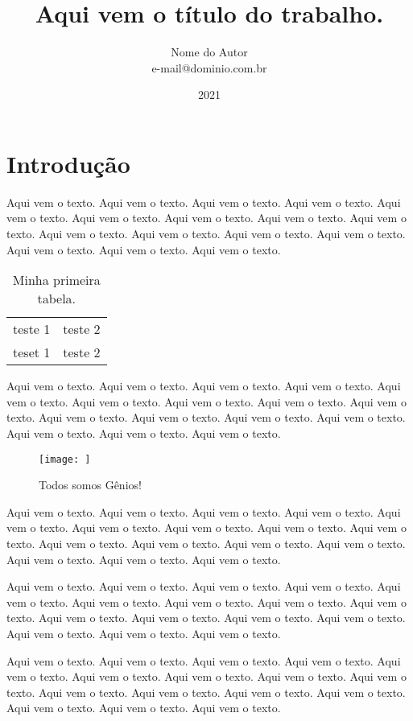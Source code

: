 \documentclass[a4paper, 12pt]{article}
\title{Aqui vem o título do trabalho.}
\author{Nome do Autor \\ e-mail@dominio.com.br}
\date{2021}
\begin{document}
\maketitle
\tableofcontents \newpage
\listoffigures \newpage
\listoftables \newpage

\section{Introdução}

Aqui vem o texto. Aqui vem o texto. Aqui vem o texto. Aqui vem o texto.
Aqui vem o texto. Aqui vem o texto. Aqui vem o texto. Aqui vem o texto.
Aqui vem o texto. Aqui vem o texto. Aqui vem o texto. Aqui vem o texto.
Aqui vem o texto. Aqui vem o texto. Aqui vem o texto. Aqui vem o texto. \cite{meuatalho}

\begin{table}[htb]
 \centering
 \begin{tabular}{|c|c|}
  teste 1 & teste 2 \\
  teset 1 & teste 2 \\ 
 \end{tabular}
 \caption{Minha primeira tabela.}
 \label{minha-tabela}
\end{table}

Aqui vem o texto. Aqui vem o texto. Aqui vem o texto. Aqui vem o texto.
Aqui vem o texto. Aqui vem o texto. Aqui vem o texto. Aqui vem o texto.
Aqui vem o texto. Aqui vem o texto. Aqui vem o texto. Aqui vem o texto.
Aqui vem o texto. Aqui vem o texto. Aqui vem o texto. Aqui vem o texto.

\begin{figure}[htb]
 \centering
 \texttt{[image: ]}
 \caption{Todos somos Gênios!}
 \label{figura-genios}
\end{figure}

Aqui vem o texto. Aqui vem o texto. Aqui vem o texto. Aqui vem o texto.
Aqui vem o texto. Aqui vem o texto. Aqui vem o texto. Aqui vem o texto.
Aqui vem o texto. Aqui vem o texto. Aqui vem o texto. Aqui vem o texto.
Aqui vem o texto. Aqui vem o texto. Aqui vem o texto. Aqui vem o texto.

Aqui vem o texto. Aqui vem o texto. Aqui vem o texto. Aqui vem o texto.
Aqui vem o texto. Aqui vem o texto. Aqui vem o texto. Aqui vem o texto.
Aqui vem o texto. Aqui vem o texto. Aqui vem o texto. Aqui vem o texto.
Aqui vem o texto. Aqui vem o texto. Aqui vem o texto. Aqui vem o texto.

Aqui vem o texto. Aqui vem o texto. Aqui vem o texto. Aqui vem o texto.
Aqui vem o texto. Aqui vem o texto. Aqui vem o texto. Aqui vem o texto.
Aqui vem o texto. Aqui vem o texto. Aqui vem o texto. Aqui vem o texto.
Aqui vem o texto. Aqui vem o texto. Aqui vem o texto. Aqui vem o texto.
\end{document}

